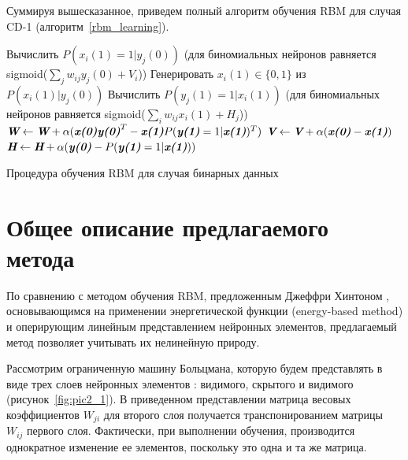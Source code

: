 Суммируя вышесказанное, приведем полный алгоритм обучения RBM для случая CD-1 (алгоритм~\ref{rbm_learning}).

\begin{algo}[h]
	
	{
		Вычислить $P(x_{i}(1)=1|y_j(0))$ (для биномиальных нейронов равняется sigmoid($\sum_{j}{w_{ij}y_{j}(0)} + V_i$))\;
		Генерировать $x_{i}(1) \in \{0, 1\}$ из $P(x_{i}(1)|y_j(0))$\;
	}	
	{
		Вычислить $P(y_{j}(1)=1|x_i(1))$ (для биномиальных нейронов равняется sigmoid($\sum_{i}{w_{ij}x_{i}(1)} + H_j$))\;
	}
	$\textit{\textbf{W}} \leftarrow \textit{\textbf{W}} + \alpha(\textbf{\textit{x(0)}}\textit{\textbf{y(0)}}^T - \textit{\textbf{x(1)}}P(\textit{\textbf{y(1)}}=1|\textit{\textbf{x(1)}})^T)$\;
	$\textit{\textbf{V}} \leftarrow \textit{\textbf{V}} + \alpha(\textit{\textbf{x(0)}} - \textit{\textbf{x(1)}})$\;
	$\textit{\textbf{H}} \leftarrow \textit{\textbf{H}} + \alpha(\textit{\textbf{y(0)}} - P(\textit{\textbf{y(1)}}=1|\textit{\textbf{x(1)}}))$\;
    \caption{Процедура обучения RBM для случая бинарных данных}
	\label{rbm_learning}
\end{algo}

\section{Общее описание предлагаемого метода}

По сравнению с методом обучения RBM, предложенным Джеффри Хинтоном \cite[c.~3]{hinton2010}, основывающимся на применении энергетической функции (energy-based method) и оперирующим линейным представлением нейронных элементов, предлагаемый метод позволяет учитывать их нелинейную природу. 
 
Рассмотрим ограниченную машину Больцмана, которую будем представлять в виде трех слоев нейронных элементов \cite[c.~131]{4-A}: видимого, скрытого и видимого (рисунок~\ref{fig:pic2_1}). В приведенном представлении матрица весовых коэффициентов $W_{ji}$ для второго слоя получается транспонированием матрицы $W_{ij}$ первого слоя. Фактически, при выполнении обучения, производится однократное изменение ее элементов, поскольку это одна и та же матрица.

